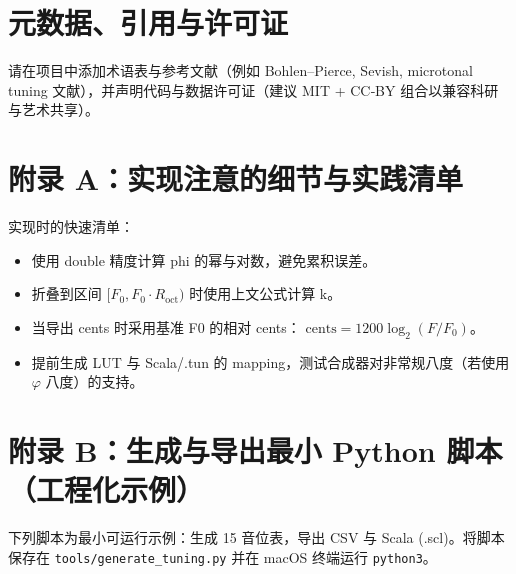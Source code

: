 \documentclass{article}
\begin{document}
\section{元数据、引用与许可证}
请在项目中添加术语表与参考文献（例如 Bohlen–Pierce, Sevish, microtonal tuning 文献），并声明代码与数据许可证（建议 MIT + CC‑BY 组合以兼容科研与艺术共享）。

\section{附录 A：实现注意的细节与实践清单}
实现时的快速清单：
\begin{itemize}
  \item 使用 double 精度计算 phi 的幂与对数，避免累积误差。
  \item 折叠到区间 $[F_0, F_0\cdot R_{\mathrm{oct}})$ 时使用上文公式计算 k。
  \item 当导出 cents 时采用基准 F0 的相对 cents： $\mathrm{cents}=1200\log_2(F/F_0)$。
  \item 提前生成 LUT 与 Scala/.tun 的 mapping，测试合成器对非常规八度（若使用 $\varphi$ 八度）的支持。
\end{itemize}

\section{附录 B：生成与导出最小 Python 脚本（工程化示例）}
下列脚本为最小可运行示例：生成 15 音位表，导出 CSV 与 Scala (.scl)。将脚本保存在 \texttt{tools/generate\_tuning.py} 并在 macOS 终端运行 \texttt{python3}。
\end{document}
